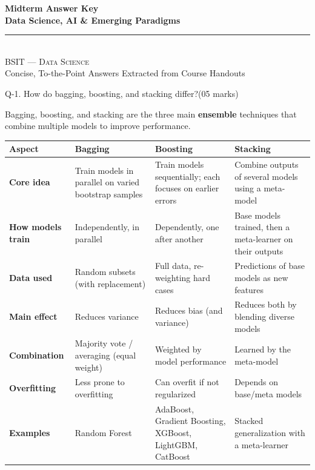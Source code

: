 \documentclass[11pt,a4paper]{article}
\newcommand{\question}[2]{%
  \begin{qbox}#1\hfill\textcolor{accent}{(05 marks)}\\[2pt]#2\end{qbox}%
}
\begin{document}
\begin{center}
\vspace*{0.3cm}
{\Huge\bfseries\textcolor{primary}{Midterm Answer Key}}\\[8pt]
{\Large\bfseries\textcolor{primary}{Data Science, AI \& Emerging Paradigms}}\\[14pt]
{\color{secondary}\rule{0.6\textwidth}{1.5pt}}\\[12pt]
{\Large\textsc{BSIT --- Data Science}}\\[6pt]
{\large\textcolor{gray!70!black}{Concise, To-the-Point Answers Extracted from Course Handouts}}
\vspace{0.2cm}
\end{center}

\question{Q-1. How do bagging, boosting, and stacking differ?}{}

Bagging, boosting, and stacking are the three main \textbf{ensemble} techniques that combine multiple models to improve performance.

\begin{center}
\begin{tabular}{@{}>{\bfseries}p{2.4cm}p{3.6cm}p{3.6cm}p{4.4cm}@{}}
\toprule
\rowcolor{primary!15}
\textbf{Aspect} & \textbf{Bagging} & \textbf{Boosting} & \textbf{Stacking} \\
\midrule
Core idea & Train models in parallel on varied bootstrap samples & Train models sequentially; each focuses on earlier errors & Combine outputs of several models using a meta-model \\
How models train & Independently, in parallel & Dependently, one after another & Base models trained, then a meta-learner on their outputs \\
Data used & Random subsets (with replacement) & Full data, re-weighting hard cases & Predictions of base models as new features \\
Main effect & Reduces variance & Reduces bias (and variance) & Reduces both by blending diverse models \\
Combination & Majority vote / averaging (equal weight) & Weighted by model performance & Learned by the meta-model \\
Overfitting & Less prone to overfitting & Can overfit if not regularized & Depends on base/meta models \\
Examples & Random Forest & AdaBoost, Gradient Boosting, XGBoost, LightGBM, CatBoost & Stacked generalization with a meta-learner \\
\bottomrule
\end{tabular}
\end{center}
\end{document}
